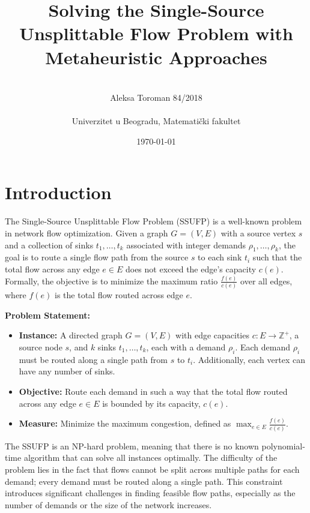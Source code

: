 \documentclass[a4paper,12pt]{article}
\title{Solving the Single-Source Unsplittable Flow Problem with Metaheuristic Approaches}
\author{\\Aleksa Toroman 84/2018 \\\\ Univerzitet u Beogradu, Matematički fakultet}
\date{\today}
\begin{document}
\maketitle

\newpage
\renewcommand{\contentsname}{Table of contents}
\tableofcontents

\newpage

\section{Introduction}

The Single-Source Unsplittable Flow Problem (SSUFP) is a well-known problem in network flow optimization. Given a graph $G = (V, E)$ with a source vertex $s$ and a collection of sinks $t_1, \ldots, t_k$ associated with integer demands $\rho_1, \ldots, \rho_k$, the goal is to route a single flow path from the source $s$ to each sink $t_i$ such that the total flow across any edge $e \in E$ does not exceed the edge’s capacity $c(e)$. Formally, the objective is to minimize the maximum ratio $\frac{f(e)}{c(e)}$ over all edges, where $f(e)$ is the total flow routed across edge $e$.

\noindent \textbf{Problem Statement:}

\begin{itemize}
    \item \textbf{Instance:} A directed graph $G=(V, E)$ with edge capacities $c: E \to \mathbb{Z}^+$, a source node $s$, and $k$ sinks $t_1, \ldots, t_k$, each with a demand $\rho_i$. Each demand $\rho_i$ must be routed along a single path from $s$ to $t_i$. Additionally, each vertex can have any number of sinks.
    \item \textbf{Objective:} Route each demand in such a way that the total flow routed across any edge $e \in E$ is bounded by its capacity, $c(e)$.
    \item \textbf{Measure:} Minimize the maximum congestion, defined as $\max_{e \in E} \frac{f(e)}{c(e)}$.
\end{itemize}

\noindent The SSUFP is an NP-hard problem, meaning that there is no known polynomial-time algorithm that can solve all instances optimally. The difficulty of the problem lies in the fact that flows cannot be split across multiple paths for each demand; every demand must be routed along a single path. This constraint introduces significant challenges in finding feasible flow paths, especially as the number of demands or the size of the network increases. \\
\end{document}
